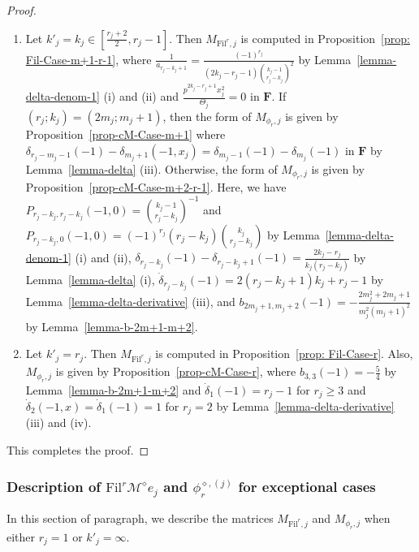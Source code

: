 \documentclass[11pt]{amsart}
\theoremstyle{definition}
\numberwithin{equation}{subsection}
\theoremstyle{plain}
\theoremstyle{plain}
\theoremstyle{plain}
\theoremstyle{plain}
\theoremstyle{plain}
\theoremstyle{plain}
\theoremstyle{plain}
\theoremstyle{plain}
\theoremstyle{plain}
\theoremstyle{plain}
\theoremstyle{plain}
\theoremstyle{plain}
\theoremstyle{definition}
\theoremstyle{definition}
\theoremstyle{definition}
\theoremstyle{remark}
\renewcommand{\(}{\textup{(}}
\renewcommand{\)}{\textup{)}}
\newcommand{\F}{\mathbf{F}}
\newcommand{\cM}{\mathcal{M}}
\newcommand{\Fil}{\mathrm{Fil}}
\begin{document}
\begin{proof}
\begin{enumerate}[leftmargin=*]
\item Let $k'_j=k_j\in[\frac{r_j+2}{2},r_j-1]$. Then $M_{\Fil^r,j}$ is computed in Proposition~\ref{prop: Fil-Case-m+1-r-1}, where $\frac{1}{a_{r_j-k_j+1}}=\frac{(-1)^{r_j}}{(2k_j-r_j-1)\binom{k_j-1}{r_j-k_j}^2}$ by Lemma~\ref{lemma-delta-denom-1} (i) and (ii) and $\frac{p^{2k_j-r_j+1}x_j^2}{\Theta_j}=0$ in $\F$. If $(r_j;k_j)=(2m_j;m_j+1)$, then the form of $M_{\phi_r,j}$ is given by Proposition~\ref{prop-cM-Case-m+1} where $\delta_{r_j-m_j-1}(-1)-\delta_{m_j+1}(-1,x_j)=\delta_{m_j-1}(-1)-\delta_{m_j}(-1)$ in $\F$ by Lemma~\ref{lemma-delta} (iii). Otherwise, the form of $M_{\phi_r,j}$ is given by Proposition~\ref{prop-cM-Case-m+2-r-1}. Here, we have $P_{r_j-k_j,r_j-k_j}(-1,0)=\binom{k_j-1}{r_j-k_j}^{-1}$ and $P_{r_j-k_j,0}(-1,0)=(-1)^{r_j}(r_j-k_j)\binom{k_j}{r_j-k_j}$ by Lemma~\ref{lemma-delta-denom-1} (i) and (ii), $\delta_{r_j-k_j}(-1)-\delta_{r_j-k_j+1}(-1)=\frac{2k_j-r_j}{k_j(r_j-k_j)}$ by Lemma~\ref{lemma-delta} (i), $\dot\delta_{r_j-k_j}(-1)=2(r_j-k_j+1)k_j+r_j-1$ by Lemma~\ref{lemma-delta-derivative} (iii), and $b_{2m_j+1,m_j+2}(-1)=-\frac{2m_j^2+2m_j+1}{m_j^2(m_j+1)^2}$ by Lemma~\ref{lemma-b-2m+1-m+2}.
\item Let $k'_j=r_j$. Then $M_{\Fil^r,j}$ is computed in Proposition~\ref{prop: Fil-Case-r}. Also, $M_{\phi_r,j}$ is given by Proposition~\ref{prop-cM-Case-r}, where $b_{3,3}(-1)=-\frac{5}{4}$ by Lemma~\ref{lemma-b-2m+1-m+2} and $\dot\delta_1(-1)=r_j-1$ for $r_j\geq 3$ and $\dot\delta_2(-1,x)=\dot\delta_1(-1)=1$ for $r_j=2$ by Lemma~\ref{lemma-delta-derivative} (iii) and (iv).
\end{enumerate}
This completes the proof.
\end{proof}

\subsubsection{\textbf{Description of $\Fil^r\cM^\diamond e_j$ and $\phi_r^{\diamond,(j)}$ for exceptional cases}}
In this section of paragraph, we describe the matrices $M_{\Fil^r,j}$ and $M_{\phi_r,j}$ when either $r_j=1$ or $k'_j=\infty$.
\end{document}

